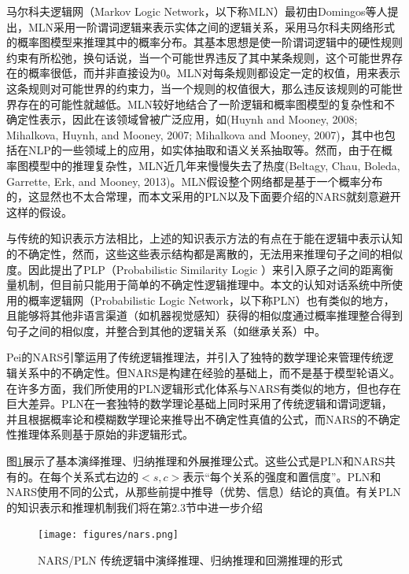 \begin{enumerate}
\begin{enumerate}
     马尔科夫逻辑网（Markov Logic Network，以下称MLN）最初由Domingos等人提出\cite{Domingos2007}，MLN采用一阶谓词逻辑来表示实体之间的逻辑关系，采用马尔科夫网络形式的概率图模型来推理其中的概率分布。其基本思想是使一阶谓词逻辑中的硬性规则约束有所松弛，换句话说，当一个可能世界违反了其中某条规则，这个可能世界存在的概率很低，而并非直接设为0。MLN对每条规则都设定一定的权值，用来表示这条规则对可能世界的约束力，当一个规则的权值很大，那么违反该规则的可能世界存在的可能性就越低。MLN较好地结合了一阶逻辑和概率图模型的复杂性和不确定性表示，因此在该领域曾被广泛应用，如(Huynh and Mooney, 2008; Mihalkova, Huynh, and Mooney, 2007; Mihalkova and Mooney, 2007)，其中也包括在NLP的一些领域上的应用，如实体抽取和语义关系抽取等。然而，由于在概率图模型中的推理复杂性，MLN近几年来慢慢失去了热度(Beltagy, Chau, Boleda, Garrette, Erk, and Mooney, 2013)。MLN假设整个网络都是基于一个概率分布的，这显然也不太合常理，而本文采用的PLN以及下面要介绍的NARS\cite{Wang2006}就刻意避开这样的假设。

     与传统的知识表示方法相比，上述的知识表示方法的有点在于能在逻辑中表示认知的不确定性，然而，这些这些表示结构都是离散的，无法用来推理句子之间的相似度。因此\cite{Brocheler2012}提出了PLP（Probabilistic Similarity Logic ）来引入原子之间的距离衡量机制，但目前只能用于简单的不确定性逻辑推理中。本文的认知对话系统中所使用的概率逻辑网（Probabilistic Logic Network，以下称PLN）也有类似的地方，且能够将其他非语言渠道（如机器视觉感知）获得的相似度通过概率推理整合得到句子之间的相似度，并整合到其他的逻辑关系（如继承关系）中。

      Pei的NARS\cite{Wang2006}引擎运用了传统逻辑推理法，并引入了独特的数学理论来管理传统逻辑关系中的不确定性。但NARS是构建在经验的基础上，而不是基于模型轮语义。 在许多方面，我们所使用的PLN逻辑形式化体系与NARS有类似的地方，但也存在巨大差异。PLN在一套独特的数学理论基础上同时采用了传统逻辑和谓词逻辑，并且根据概率论和模糊数学理论来推导出不确定性真值的公式，而NARS的不确定性推理体系则基于原始的非逻辑形式。

     图\ref{fig:nars}展示了基本演绎推理、归纳推理和外展推理公式。这些公式是PLN和NARS共有的。在每个关系式右边的$<s,c>$表示“每个关系的强度和置信度”。PLN和NARS使用不同的公式，从那些前提中推导（优势、信息）结论的真值。有关PLN的知识表示和推理机制我们将在第2.3节中进一步介绍

\begin{figure}[htb]
\centering
\texttt{[image: figures/nars.png]}
\caption{ NARS/PLN 传统逻辑中演绎推理、归纳推理和回溯推理的形式 }
\label{fig:nars}
\end{figure}



\end{enumerate}
\end{enumerate}
